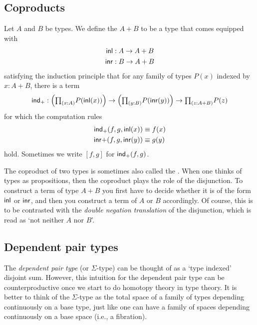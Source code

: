 \subsection{Coproducts}
\begin{defn}
Let $A$ and $B$ be types. We define the  $A+B$ to be a type that comes equipped with
\begin{align*}
{\mathsf{inl}} & : A \to A+B \\
{\mathsf{inr}} & : B \to A+B
\end{align*}
satisfying the induction principle that for any family of types $P(x)$ indexed by $x:A+B$, there is a term
\begin{equation*}
\ind{+} : \Big(\prd{x:A}P(\inl(x))\Big)\to\Big(\prd{y:B}P(\inr(y))\Big)\to\prd{z:A+B}P(z)
\end{equation*}
for which the computation rules
\begin{align*}
\mathsf{ind}_{+}(f,g,{\mathsf{inl}}(x)) & \equiv f(x) \\
{\mathsf{inr}}{+}(f,g,{\mathsf{inr}}(y)) & \equiv g(y)
\end{align*}
hold. Sometimes we write $[f,g]$ for $\mathsf{ind}_{+}(f,g)$.
\end{defn}

The coproduct of two types is sometimes also called the .
When one thinks of types as propositions, then the coproduct plays the role of the disjunction.
To construct a term of type $A+B$ you first have to decide whether it is of the form ${\mathsf{inl}}$ or ${\mathsf{inr}}$, and then you construct a term of $A$ or $B$ accordingly. Of course, this is to be contrasted with the \emph{double negation translation} of the disjunction, which is read as `not neither $A$ nor $B$'. 

\subsection{Dependent pair types}
The \emph{dependent pair type} (or $\Sigma$-type) can be thought of as a `type indexed' disjoint sum.
However, this intuition for the dependent pair type can be counterproductive once we start to do homotopy theory in type theory.
It is better to think of the $\Sigma$-type as the total space of a family of types depending continuously on a base type, just like one can have a family of spaces depending continuously on a base space (i.e., a fibration).

